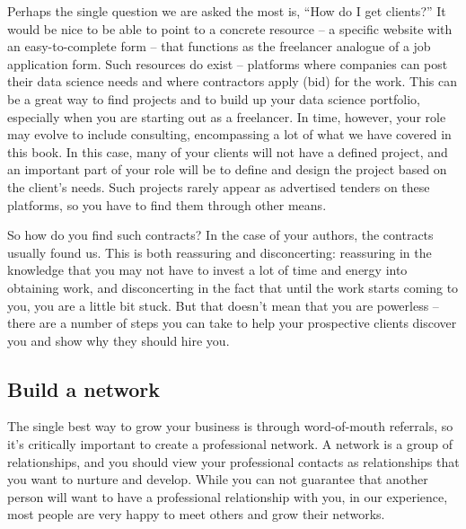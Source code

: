 \documentclass[
]{book}
\begin{document}
Perhaps the single question we are asked the most is, ``How do I get clients?'' It would be nice to be able to point to a concrete resource -- a specific website with an easy-to-complete form -- that functions as the freelancer analogue of a job application form. Such resources do exist -- platforms where companies can post their data science needs and where contractors apply (bid) for the work. This can be a great way to find projects and to build up your data science portfolio, especially when you are starting out as a freelancer. In time, however, your role may evolve to include consulting, encompassing a lot of what we have covered in this book. In this case, many of your clients will not have a defined project, and an important part of your role will be to define and design the project based on the client's needs. Such projects rarely appear as advertised tenders on these platforms, so you have to find them through other means.

So how do you find such contracts? In the case of your authors, the contracts usually found us. This is both reassuring and disconcerting: reassuring in the knowledge that you may not have to invest a lot of time and energy into obtaining work, and disconcerting in the fact that until the work starts coming to you, you are a little bit stuck. But that doesn't mean that you are powerless -- there are a number of steps you can take to help your prospective clients discover you and show why they should hire you.

\hypertarget{build-a-network}{%
\subsection{Build a network}\label{build-a-network}}

The single best way to grow your business is through word-of-mouth referrals, so it's critically important to create a professional network. A network is a group of relationships, and you should view your professional contacts as relationships that you want to nurture and develop. While you can not guarantee that another person will want to have a professional relationship with you, in our experience, most people are very happy to meet others and grow their networks.
\end{document}
